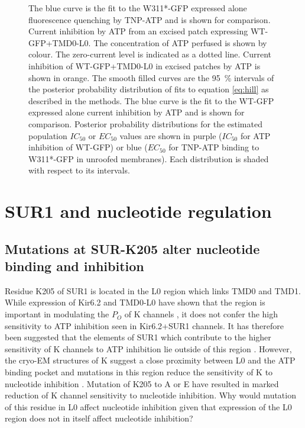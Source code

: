 \begin{figure}[h]
{	The blue curve is the fit to the W311*-GFP expressed alone fluorescence quenching by TNP-ATP and is shown for comparison.
	 Current inhibition by ATP from an excised patch expressing WT-GFP+TMD0-L0.
	The concentration of ATP perfused is shown by colour.
	The zero-current level is indicated as a dotted line.
	 Current inhibition of WT-GFP+TMD0-L0 in excised patches by ATP is shown in orange.
	The smooth filled curves are the \SI{95}{\percent} intervals of the posterior probability distribution of fits to equation \ref{eq:hill} as described in the methods.
	The blue curve is the fit to the WT-GFP expressed alone current inhibition by ATP and is shown for comparison.
	 Posterior probability distributions for the estimated population $IC_{50}$ or $EC_{50}$ values are shown in purple ($IC_{50}$ for ATP inhibition of WT-GFP) or blue ($EC_{50}$ for TNP-ATP binding to W311*-GFP in unroofed membranes).
	Each distribution is shaded with respect to its intervals.
	}\label{ch6fig:tmd0_binding}
\end{figure}

\section{SUR1 and nucleotide regulation}

\subsection{Mutations at SUR-K205 alter nucleotide binding and inhibition}

Residue K205 of SUR1 is located in the L0 region which links TMD0 and TMD1.
While expression of Kir6.2 and TMD0-L0 have shown that the region is important in modulating the $P_O$ of K\ATP{} channels \cite{babenko_sur_2003, chan_n-terminal_2003-1, pratt_n-terminal_2011}, it does not confer the high sensitivity to ATP inhibition seen in Kir6.2+SUR1 channels.
It has therefore been suggested that the elements of SUR1 which contribute to the higher sensitivity of K\ATP{} channels to ATP inhibition lie outside of this region \cite{babenko_sur_2003, pratt_engineered_2012-1}.
However, the cryo-EM structures of K\ATP{} suggest a close proximity between L0 and the ATP binding pocket \cite{martin_anti-diabetic_2017-1, lee_molecular_2017-1, li_structure_2017} and mutations in this region reduce the sensitivity of K\ATP{} to nucleotide inhibition \cite{ding_structural_2019,pratt_engineered_2012-1, masia_mutation_2007}.
Mutation of K205 to A \cite{ding_structural_2019} or E \cite{ding_structural_2019} have resulted in marked reduction of K\ATP{} channel sensitivity to nucleotide inhibition.
Why would mutation of this residue in L0 affect nucleotide inhibition given that expression of the L0 region does not in itself affect nucleotide inhibition?

